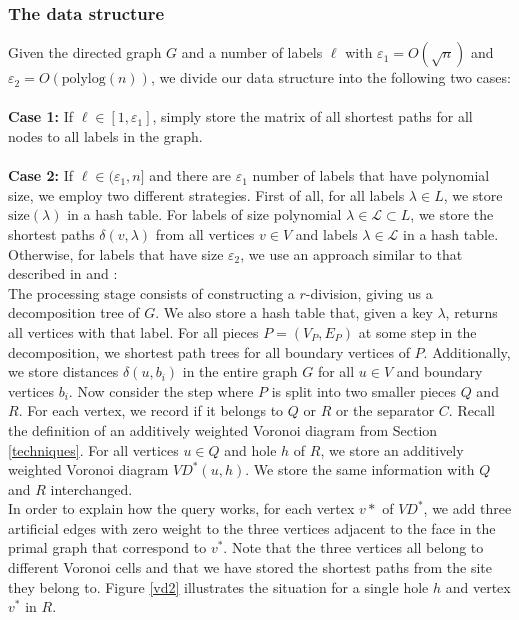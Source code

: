 \subsubsection{The data structure}
Given the directed graph $G$ and a number of labels $\ell$ with
$\varepsilon_1 = O(\sqrt{n})$ and $\varepsilon_2=O(\text{polylog}(n))$, we divide our
data structure into the following two cases: \\
\\
\textbf{Case 1:} If $\ell\in [1, \varepsilon_1]$, simply store the matrix of all shortest paths for all nodes to all
labels in the graph. \\
\\
\textbf{Case 2:} If $\ell\in (\varepsilon_1, n]$ and there are $\varepsilon_1$ number of labels that have
polynomial size, we employ two different strategies. First of all, for all labels
$\lambda\in L$, we
store $\text{size}(\lambda)$ in a hash table. For labels of size polynomial
$\lambda \in \mathcal{L} \subset L$, we store the
shortest paths $\delta(v, \lambda)$ from all vertices $v\in V$ and labels $\lambda\in
\mathcal{L}$ in a hash table. Otherwise, for labels that have size
$\varepsilon_2$, we
use an approach similar to that described in \cite{cohen2017fast} and
\cite{gawrychowski2017better}: \\
\indent The processing stage consists of constructing a $r$-division,
giving us a decomposition tree of $G$. We also store a hash table that, given a key
$\lambda$, returns all vertices with that label. For all pieces $P=(V_P, E_P)$ at some
step in the decomposition, we shortest path trees for all boundary vertices of $P$.
Additionally, we store distances $\delta(u,b_i)$ in the entire graph $G$ for all $u\in V$ and boundary vertices $b_i$. Now
consider the step where $P$ is split into two smaller pieces $Q$ and $R$. For each
vertex, we record if it belongs to $Q$ or $R$ or the separator $C$. Recall the definition of an
additively weighted Voronoi diagram from Section \ref{techniques}. For all vertices $u\in
Q$ and hole $h$ of $R$, we store an additively weighted
Voronoi diagram $VD^*(u,h)$. We store the
same information with $Q$ and $R$ interchanged. \\
In order to explain how the
query works, for each vertex $v*$ of $VD^*$, we add three artificial edges with zero
weight to the three vertices adjacent
to the face in the primal graph that correspond to $v^*$. Note that the three vertices all
belong to different Voronoi cells and that we have stored the shortest paths from the site they
belong to. Figure \ref{vd2} illustrates the
situation for a single hole $h$ and vertex $v^*$ in $R$.

